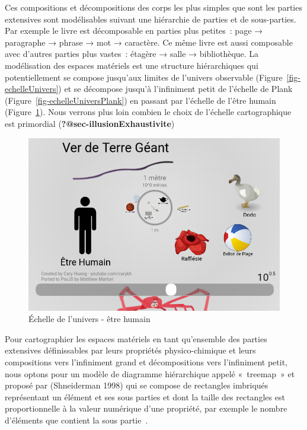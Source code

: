 \documentclass[
  letterpaper,
  DIV=11,
  numbers=noendperiod]{scrreprt}
\begin{document}
Ces compositions et décompositions des corps les plus simples que sont
les parties extensives sont modélisables suivant une hiérarchie de
parties et de sous-parties. Par exemple le livre est décomposable en
parties plus petites~: page → paragraphe → phrase → mot → caractère. Ce
même livre est aussi composable avec d'autres parties plus vastes~:
étagère → salle → bibliothèque. La modélisation des espaces matériels
est une structure hiérarchiques qui potentiellement se compose jusqu'aux
limites de l'univers observable (Figure~\ref{fig-echelleUnivers}) et se
décompose jusqu'à l'infiniment petit de l'échelle de Plank
(Figure~\ref{fig-echelleUniversPlank}) en passant par l'échelle de
l'être humain (Figure~\ref{fig-echelleHumain}). Nous verrons plus loin
combien le choix de l'échelle cartographique est primordial
(\textbf{?@sec-illusionExhaustivite})

\begin{figure}

{\centering \includegraphics{media/100000010000030E00000219C3ED261C6D514C78.png}

}

\caption{\label{fig-echelleHumain}Échelle de l'univers - être humain}

\end{figure}

Pour cartographier les espaces matériels en tant qu'ensemble des parties
extensives définissables par leurs propriétés physico-chimique et leurs
compositions vers l'infiniment grand et décompositions vers l'infiniment
petit, nous optons pour un modèle de diagramme hiérarchique appelé
«~treemap~» et proposé par (Shneiderman 1998) qui se compose de
rectangles imbriqués représentant un élément et ses sous parties et dont
la taille des rectangles est proportionnelle à la valeur numérique d'une
propriété, par exemple le nombre d'éléments que contient la sous
partie~.
\end{document}
